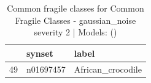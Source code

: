\begin{table}
\caption{Common fragile classes for Common Fragile Classes - gaussian_noise severity 2 | Models: ()}
\label{tab:Common Fragile Classes - gaussian_noise severity 2_d41d8cd9}
\begin{tabular}{cll}
\toprule
 & synset & label \\
\midrule
49 & n01697457 & African_crocodile \\
\bottomrule
\end{tabular}
\end{table}
